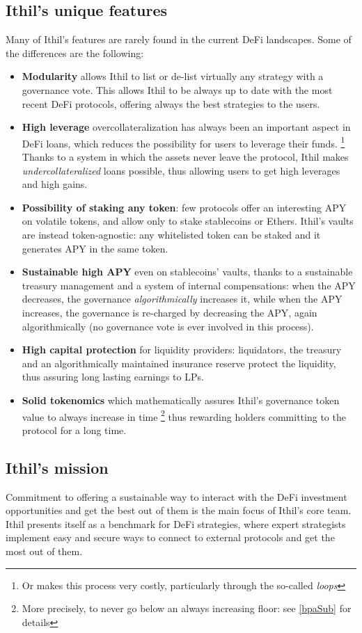 \documentclass[a4paper,10 pt]{article}
\theoremstyle{definition}
\begin{document}
\subsection{Ithil's unique features}
Many of Ithil's features are rarely found in the current DeFi landscapes. Some of the differences are the following:
\begin{itemize}
\item {\bf Modularity} allows Ithil to list or de-list virtually any strategy with a governance vote. This allows Ithil to be always up to date with the most recent DeFi protocols, offering always the best strategies to the users.
\item {\bf High leverage} overcollateralization has always been an important aspect in DeFi loans, which reduces the possibility for users to leverage their funds. \footnote{Or makes this process very costly, particularly through the so-called {\it loops}} Thanks to a system in which the assets never leave the protocol, Ithil makes {\it undercollateralized} loans possible, thus allowing users to get high leverages and high gains.
\item {\bf Possibility of staking any token}: few protocols offer an interesting APY on volatile tokens, and allow only to stake stablecoins or Ethers. Ithil's vaults are instead token-agnostic: any whitelisted token can be staked and it generates APY in the same token.
\item {\bf Sustainable high APY} even on stablecoins' vaults, thanks to a sustainable treasury management and a system of internal compensations: when the APY decreases, the governance {\it algorithmically} increases it, while when the APY increases, the governance is re-charged by decreasing the APY, again algorithmically (no governance vote is ever involved in this process).
\item {\bf High capital protection} for liquidity providers: liquidators, the treasury and an algorithmically maintained insurance reserve protect the liquidity, thus assuring long lasting earnings to LPs.
\item {\bf Solid tokenomics} which mathematically assures Ithil's governance token value to always increase in time \footnote{More precisely, to never go below an always increasing floor: see \ref{bpaSub} for details} thus rewarding holders committing to the protocol for a long time.
\end{itemize}

\subsection{Ithil's mission}
Commitment to offering a sustainable way to interact with the DeFi investment opportunities and get the best out of them is the main focus of Ithil's core team. Ithil presents itself as a benchmark for DeFi strategies, where expert strategists implement easy and secure ways to connect to external protocols and get the most out of them.
\end{document}
